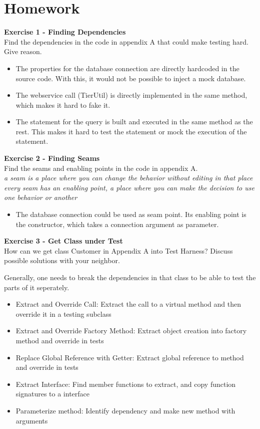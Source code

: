\section{Homework}

\textbf{Exercise 1 - Finding Dependencies} \\
Find the dependencies in the code in appendix A that could make testing hard. Give reason. 

\begin{itemize}
    \item The properties for the database connection are directly hardcoded in the source code. With this, it would not be possible to inject a mock database.
    \item The webservice call (TierUtil) is directly implemented in the same method, which makes it hard to fake it.
    \item The statement for the query is built and executed in the same method as the rest. This makes it hard to test the statement or mock the execution of the statement.
\end{itemize}

\textbf{Exercise 2 - Finding Seams} \\
Find the seams and enabling points in the code in appendix A. \\
\textit{a seam is a place where you can change the behavior without editing in that place
every seam has an enabling point, a place where you can make the decision to use one behavior or another}

\begin{itemize}
    \item The database connection could be used as seam point. Its enabling point is the constructor, which takes a connection argument as parameter.
\end{itemize}

\textbf{Exercise 3 - Get Class under Test} \\
How can we get class Customer in Appendix A into Test Harness? Discuss possible solutions with your neighbor. 

Generally, one needs to break the dependencies in that class to be able to test the parts of it seperately. 

\begin{itemize}
    \item Extract and Override Call: Extract the call to a virtual method and then override it in a testing subclass
    \item Extract and Override Factory Method: Extract object creation into factory method and override in tests
    \item Replace Global Reference with Getter: Extract global reference to method and override in tests
    \item Extract Interface: Find member functions to extract, and copy function signatures to a interface
    \item Parameterize method: Identify dependency and make new method with arguments
\end{itemize}

